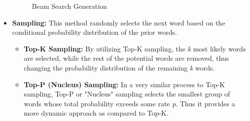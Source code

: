 \documentclass[12pt]{report}
\begin{document}
\begin{itemize}
            \begin{figure}[H]
            \centering
            \caption{Beam Search Generation ~\cite{HF}}
            \label{fig:beam}
            \end{figure}
            
            \newpage
            
            \item \textbf{Sampling:} This method randomly selects the next word based on the conditional probability distribution of the prior words.
            \begin{itemize}
                \item \textbf{Top-K Sampling:} By utilizing Top-K sampling, the \textit{k} most likely words are selected, while the rest of the potential words are removed, thus changing the probability distribution of the remaining \textit{k} words.
                \item \textbf{Top-P (Nucleus) Sampling:} In a very similar process to Top-K sampling, Top-P or "Nucleus" sampling selects the smallest group of words whose total probability exceeds some rate \textit{p}. Thus it provides a more dynamic approach as compared to Top-K.
            

\end{itemize}
\end{itemize}
\end{document}
